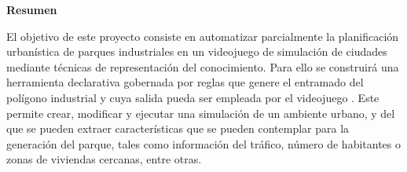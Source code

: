 \vspace*{4em}

{\Huge\bfseries{Resumen}\par}

\vspace*{2em}

{El objetivo de este proyecto consiste en automatizar parcialmente la planificación urbanística de parques industriales en un videojuego de simulación de ciudades mediante técnicas de representación del conocimiento. Para ello se construirá una herramienta declarativa gobernada por reglas que genere el entramado del polígono industrial y cuya salida pueda ser empleada por el videojuego \cities. Este permite crear, modificar y ejecutar una simulación de un ambiente urbano, y del que se pueden extraer características que se pueden contemplar para la generación del parque, tales como información del tráfico, número de habitantes o zonas de viviendas cercanas, entre otras.}\par

\vspace*{\fill}